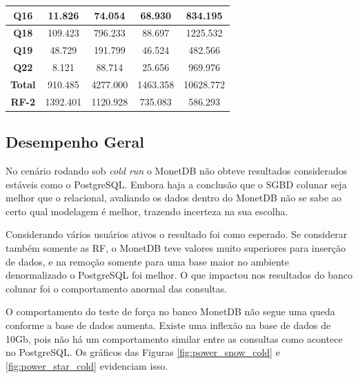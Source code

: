 \begin{table}[t]
\begin{tabular}{|c|c|c|c|c|}
        \textbf{Q16}   & 11.826                & 74.054                   & 68.930              & 834.195               \\ \hline
        \textbf{Q18}   & 109.423               & 796.233                  & 88.697              & 1225.532              \\ \hline
        \textbf{Q19}   & 48.729                & 191.799                  & 46.524              & 482.566               \\ \hline
        \textbf{Q22}   & 8.121                 & 88.714                   & 25.656              & 969.976               \\ \hline
        \textbf{Total} & 910.485               & 4277.000                 & 1463.358            & 10628.772             \\ \hline
        \textbf{RF-2}  & 1392.401              & 1120.928                 & 735.083             & 586.293               \\ \hline

\end{tabular}
\end{table}


\subsection{Desempenho Geral}

No cenário rodando sob \textit{cold run} o MonetDB não obteve resultados considerados estáveis como o PostgreSQL. Embora haja a conclusão que o SGBD colunar seja melhor que o relacional, avaliando os dados dentro do MonetDB não se sabe ao certo qual modelagem é melhor, trazendo incerteza na sua escolha. 

Considerando vários usuários ativos o resultado foi como esperado. Se considerar também somente as RF, o MonetDB teve valores muito superiores para inserção de dados, e na remoção somente para uma base maior no ambiente denormalizado o PostgreSQL foi melhor. O que impactou nos resultados do banco colunar foi o comportamento anormal das consultas.

O comportamento do teste de força no banco MonetDB não segue uma queda conforme a base de dados aumenta. Existe uma inflexão na base de dados de 10Gb, pois não há um comportamento similar entre as consultas como acontece no PostgreSQL. Os gráficos das Figuras \ref{fig:power_snow_cold} e \ref{fig:power_star_cold} evidenciam isso. 

